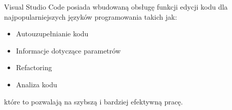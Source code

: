 Visual Studio Code posiada wbudowaną obsługę funkcji edycji kodu dla najpopularniejszych języków programowania takich jak:

\begin{itemize}
	\item Autouzupełnianie kodu
	\item Informacje dotyczące parametrów 
	\item Refactoring
	\item Analiza kodu
\end{itemize}
które to pozwalają na szybszą i bardziej efektywną pracę.
 

